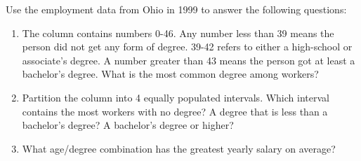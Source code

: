 \begin{problem}
Use the employment data from Ohio in 1999 to answer the following questions:

\begin{enumerate}
\item The column  contains numbers 0-46. 
Any number less than 39 means the person did not get any form of degree. 
39-42 refers to either a high-school or associate's degree.
A number greater than 43 means the person got at least a bachelor's degree. 
What is the most common degree among workers?

\item Partition the  column into 4 equally populated intervals. 
Which interval contains the most workers with no degree? 
A degree that is less than a bachelor's degree? A bachelor's degree or higher?

\item What age/degree combination has the greatest yearly salary on average?
\end{enumerate}
\end{problem}

